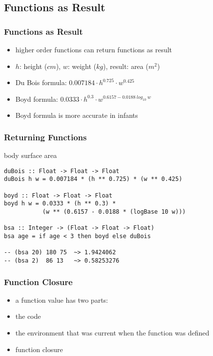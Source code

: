 \documentclass[dvipsnames]{beamer}
\theoremstyle{plain}
\begin{document}
\subsection{Functions as Result}

\begin{frame}
  \frametitle{Functions as Result}

  \begin{itemize}
    \item higher order functions can return functions as result
  \end{itemize}

  \begin{example}
    \begin{itemize}
      \item $h$: height ($cm$), $w$: weight ($kg$), result: area ($m^2$)
      \smallskip
      \item Du Bois formula:
        $0.007184 \cdot h^{0.725} \cdot w^{0.425}$\\
      \smallskip
      \item Boyd formula:
        $0.0333 \cdot h^{0.3} \cdot w^{0.6157 - 0.0188~log_{10}~w}$
      \smallskip
      \item Boyd formula is more accurate in infants
    \end{itemize}
  \end{example}
\end{frame}

\begin{frame}[fragile]
  \frametitle{Returning Functions}

  \begin{exampleblock}{body surface area}
    \begin{lstlisting}
duBois :: Float -> Float -> Float
duBois h w = 0.007184 * (h ** 0.725) * (w ** 0.425)

boyd :: Float -> Float -> Float
boyd h w = 0.0333 * (h ** 0.3) *
           (w ** (0.6157 - 0.0188 * (logBase 10 w)))

bsa :: Integer -> (Float -> Float -> Float)
bsa age = if age < 3 then boyd else duBois

-- (bsa 20) 180 75  ~> 1.9424062
-- (bsa 2)  86 13   ~> 0.58253276
    \end{lstlisting}
  \end{exampleblock}
\end{frame}

\begin{frame}[fragile]
  \frametitle{Function Closure}

  \begin{itemize}
    \item a function value has two parts:

    \medskip
    \item the code
    \item the environment that was current when the function was defined

    \medskip
    \item function \alert{closure}
  \end{itemize}
\end{frame}
\end{document}
